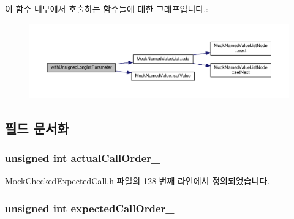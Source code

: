 이 함수 내부에서 호출하는 함수들에 대한 그래프입니다.\+:
\nopagebreak
\begin{figure}[H]
\begin{center}
\leavevmode
\includegraphics[width=350pt]{class_mock_checked_expected_call_a7da86441ae351a1a81b1093176fe75cd_cgraph}
\end{center}
\end{figure}




\subsection{필드 문서화}
\subsubsection[{\texorpdfstring{actual\+Call\+Order\+\_\+}{actualCallOrder_}}]{\setlength{\rightskip}{0pt plus 5cm}unsigned int actual\+Call\+Order\+\_\+\hspace{0.3cm}{\ttfamily [private]}}\hypertarget{class_mock_checked_expected_call_a58e873078e053e6b06ad68a8a7e0c313}{}\label{class_mock_checked_expected_call_a58e873078e053e6b06ad68a8a7e0c313}


Mock\+Checked\+Expected\+Call.\+h 파일의 128 번째 라인에서 정의되었습니다.

\subsubsection[{\texorpdfstring{expected\+Call\+Order\+\_\+}{expectedCallOrder_}}]{\setlength{\rightskip}{0pt plus 5cm}unsigned int expected\+Call\+Order\+\_\+\hspace{0.3cm}{\ttfamily [private]}}\hypertarget{class_mock_checked_expected_call_afa5b7a7d70e8552f039255ae1d85f215}{}\label{class_mock_checked_expected_call_afa5b7a7d70e8552f039255ae1d85f215}


